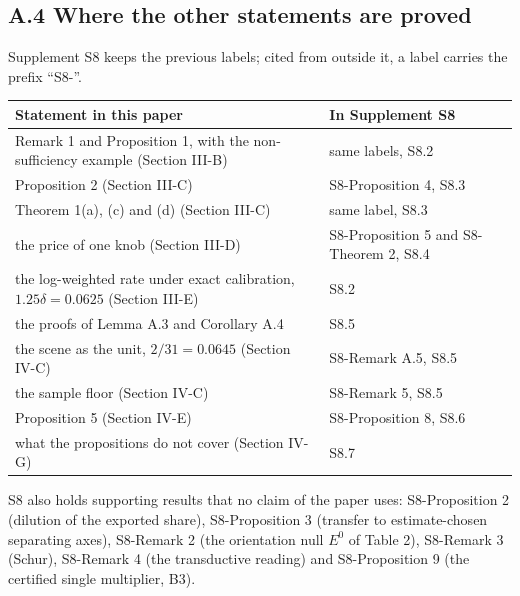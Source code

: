 \documentclass{ieeeaccess}
\begin{document}
\subsection*{A.4 Where the other statements are proved}
Supplement S8 keeps the previous labels; cited from outside it, a label carries the prefix ``S8-''.

\begin{center}
\footnotesize
\setlength{\tabcolsep}{3pt}
\renewcommand{\arraystretch}{1.15}
\begin{tabular}{@{}L{0.608\columnwidth}L{0.362\columnwidth}@{}}
\hline
Statement in this paper & In Supplement S8 \\
\hline
Remark 1 and Proposition 1, with the non-sufficiency example (Section III-B) & same labels, S8.2 \\
Proposition 2 (Section III-C) & S8-Proposition 4, S8.3 \\
Theorem 1(a), (c) and (d) (Section III-C) & same label, S8.3 \\
the price of one knob (Section III-D) & S8-Proposition 5 and S8-Theorem 2, S8.4 \\
the log-weighted rate under exact calibration, $1.25\delta = 0.0625$ (Section III-E) & S8.2 \\
the proofs of Lemma A.3 and Corollary A.4 & S8.5 \\
the scene as the unit, $2/31 = 0.0645$ (Section IV-C) & S8-Remark A.5, S8.5 \\
the sample floor (Section IV-C) & S8-Remark 5, S8.5 \\
Proposition 5 (Section IV-E) & S8-Proposition 8, S8.6 \\
what the propositions do not cover (Section IV-G) & S8.7 \\
\hline
\end{tabular}
\end{center}

S8 also holds supporting results that no claim of the paper uses: S8-Proposition 2 (dilution of the exported share), S8-Proposition 3 (transfer to estimate-chosen separating axes), S8-Remark 2 (the orientation null $E^{0}$ of Table 2), S8-Remark 3 (Schur), S8-Remark 4 (the transductive reading) and S8-Proposition 9 (the certified single multiplier, B3).
\end{document}
